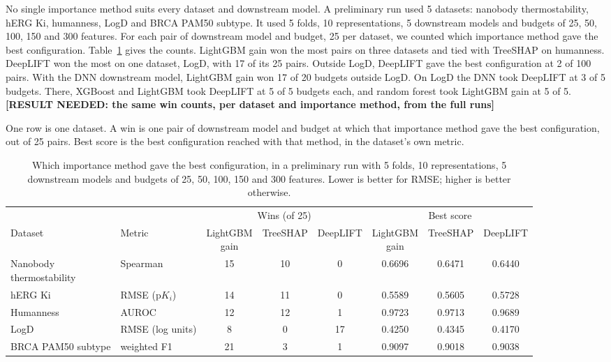 No single importance method suits every dataset and downstream model. A preliminary run used 5 datasets: nanobody thermostability, hERG Ki, humanness, LogD and BRCA PAM50 subtype. It used 5 folds, 10 representations, 5 downstream models and budgets of 25, 50, 100, 150 and 300 features. For each pair of downstream model and budget, 25 per dataset, we counted which importance method gave the best configuration. Table~\ref{tab:importance_wins} gives the counts. LightGBM gain won the most pairs on three datasets and tied with TreeSHAP on humanness. DeepLIFT won the most on one dataset, LogD, with 17 of its 25 pairs. Outside LogD, DeepLIFT gave the best configuration at 2 of 100 pairs. With the DNN downstream model, LightGBM gain won 17 of 20 budgets outside LogD. On LogD the DNN took DeepLIFT at 3 of 5 budgets. There, XGBoost and LightGBM took DeepLIFT at 5 of 5 budgets each, and random forest took LightGBM gain at 5 of 5. \textbf{[RESULT NEEDED: the same win counts, per dataset and importance method, from the full runs]}

One row is one dataset. A win is one pair of downstream model and budget at which that importance method gave the best configuration, out of 25 pairs. Best score is the best configuration reached with that method, in the dataset's own metric.
\begin{table}[htbp]
\centering
\caption[Importance method of the best configuration in a preliminary run.]{Which importance method gave the best configuration, in a preliminary run with 5 folds, 10 representations, 5 downstream models and budgets of 25, 50, 100, 150 and 300 features. Lower is better for RMSE; higher is better otherwise.}
\label{tab:importance_wins}
\small
\begin{adjustbox}{max width=\textwidth}
\begin{tabular}{@{}llcccccc@{}}
\toprule
 & & \multicolumn{3}{c}{Wins (of 25)} & \multicolumn{3}{c}{Best score} \\
\cmidrule(lr){3-5}\cmidrule(lr){6-8}
Dataset & Metric & \makecell{LightGBM\\gain} & TreeSHAP & DeepLIFT & \makecell{LightGBM\\gain} & TreeSHAP & DeepLIFT \\
\midrule
\makecell[l]{Nanobody\\thermostability} & Spearman & 15 & 10 & 0 & 0.6696 & 0.6471 & 0.6440 \\
hERG Ki & RMSE (p$K_i$) & 14 & 11 & 0 & 0.5589 & 0.5605 & 0.5728 \\
Humanness & AUROC & 12 & 12 & 1 & 0.9723 & 0.9713 & 0.9689 \\
LogD & RMSE (log units) & 8 & 0 & 17 & 0.4250 & 0.4345 & 0.4170 \\
BRCA PAM50 subtype & weighted F1 & 21 & 3 & 1 & 0.9097 & 0.9018 & 0.9038 \\
\bottomrule
\end{tabular}
\end{adjustbox}
\end{table}


